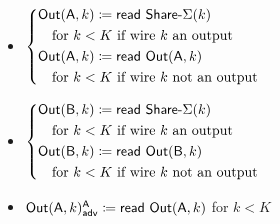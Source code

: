 \begin{itemize}
\item $\begin{cases*} \Out(\A,k) \coloneqq \read{\SumShare(k)} \\ \hspace{10pt} \text{for $k < K$ if wire $k$ an output} \\ \Out(\A,k) \coloneqq \read{\Out(\A,k)} \\ \hspace{10pt} \text{for $k < K$ if wire $k$ not an output} \end{cases*}$
\item $\begin{cases*} \Out(\B,k) \coloneqq \read{\SumShare(k)} \\ \hspace{10pt} \text{for $k < K$ if wire $k$ an output} \\ \Out(\B,k) \coloneqq \read{\Out(\B,k)} \\ \hspace{10pt} \text{for $k < K$ if wire $k$ not an output} \end{cases*}$
\item {\color{blue} $\mathsf{Out}(\mathsf{A},k)^{\mathsf{A}}_{\mathsf{adv}} \coloneqq \mathsf{read} \ \mathsf{Out}(\mathsf{A},k)$ for $k < K$}
\end{itemize}

